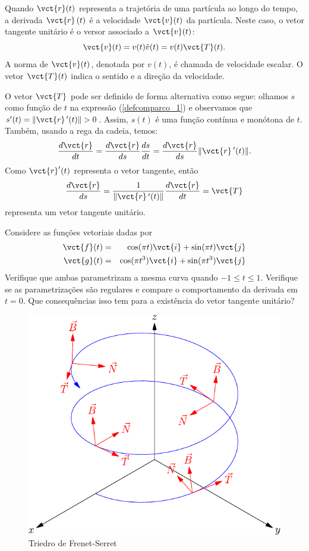 \begin{obs} Quando $\vct{r}(t)$ representa a trajetória de uma partícula ao longo do tempo, a derivada $\vct{r}\!~(t)$ é a velocidade $\vct{v}(t)$ da partícula. Neste caso, o vetor tangente unitário é o versor associado a $\vct{v}(t)$:
$$\vct{v}(t)=v(t) \hat{v}(t)=v(t) \vct{T}(t).$$
A norma de $\vct{v}(t)$, denotada por $v(t)$, é chamada de velocidade escalar. O vetor $\vct{T}(t)$ indica o sentido e a direção da velocidade.
\end{obs}

O vetor $\vct{T}$ pode ser definido de forma alternativa como segue: olhamos $s$ como função de $t$ na expressão (\ref{defcomparco_1}) e observamos que $s'(t)=\|\vct{r}\!~'(t)\|>0$. Assim, $s(t)$ é uma função contínua e monótona de $t$. Também, usando a rega da cadeia, temos:
$$
\frac{d\vct{r}}{dt}=\frac{d\vct{r}}{ds}\frac{ds}{dt}=\frac{d\vct{r}}{ds}\|\vct{r}\!~'(t)\|.
$$
Como $\vct{r}'(t)$ representa o vetor tangente, então
$$
\frac{d\vct{r}}{ds}=\frac{1}{\|\vct{r}\!~'(t)\|}\frac{d\vct{r}}{dt}=\vct{T}
$$
representa um vetor tangente unitário.

\begin{exer}
Considere as funções vetoriais dadas por
\begin{eqnarray*}
\vct{f}(t)&=&\cos(\pi t)\vct{i}+\sin(\pi t)\vct{j}\\
\vct{g}(t)&=&\cos(\pi t^3)\vct{i}+\sin(\pi t^3)\vct{j}
\end{eqnarray*}
Verifique que ambas parametrizam a mesma curva quando $-1\leq t \leq 1$. Verifique se as parametrizações são regulares e compare o comportamento da derivada em $t=0$. Que consequências isso tem para a existência do vetor tangente unitário? 
\end{exer}


\begin{figure}%
\begin{center}
    \includegraphics{./cap_curvas/figs/helice_TNB}
\caption{Triedro de Frenet-Serret}\label{Frenet_Serret}
  \end{center}
\end{figure}


